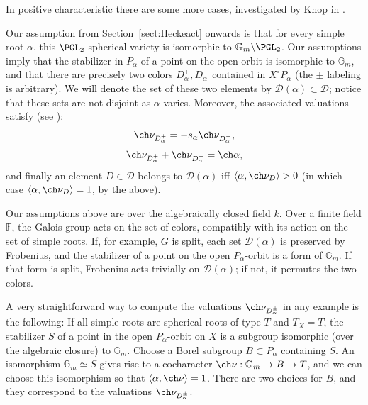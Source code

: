 In positive characteristic there are some more cases, investigated by Knop in \cite{Knop-sphericalroots}.

Our assumption from Section~\ref{sect:Heckeact} onwards is that for every simple root $\alpha$, this $\PGL_2$-spherical variety is isomorphic to $\mathbb G_m\backslash \PGL_2$. Our assumptions imply that the stabilizer in $P_\alpha$ of a point on the open orbit is isomorphic to $\mathbb G_m$, and that there are precisely two colors $D_\alpha^+, D_\alpha^-$ contained in $X^\circ P_\alpha$ (the $\pm $ labeling is arbitrary). We will denote the set of these two elements by $\mathcal D(\alpha)\subset\mathcal D$; notice that these sets are not disjoint as $\alpha$ varies. Moreover, the associated valuations satisfy (see \cite[\S 3.4]{Lun97}):
\[ \ch\nu_{D^+_\alpha} = -s_\alpha \ch\nu_{D^-_\alpha},\]
\[ \ch\nu_{D^+_\alpha} + \ch\nu_{D^-_\alpha} = \ch\alpha, \]
and finally an element $D\in \mathcal D$ belongs to $\mathcal D(\alpha)$ iff $\left<\alpha,\ch\nu_{D}\right> >0$ (in which case $\left<\alpha,\ch\nu_{D}\right> =1$, by the above).

\begin{rem}
\notready
 Our assumptions above are over the algebraically closed field $k$. Over a finite field $\mathbb F$, the Galois group acts on the set of colors, compatibly with its action on the set of simple roots. If, for example, $G$ is split, each set $\mathcal D(\alpha)$ is preserved by Frobenius, and the stabilizer of a point on the open $P_\alpha$-orbit is a form of $\mathbb G_m$. If that form is split, Frobenius acts trivially on $\mathcal D(\alpha)$; if not, it permutes the two colors.
\end{rem}


\begin{rem}
\notready\label{rem:valuation}
A very straightforward way to compute the valuations $\ch\nu_{D^{\pm}_\alpha}$ in any example is the following: If all simple roots are spherical roots of type $T$ and $T_X=T$, the stabilizer $S$ of a point in the open $P_\alpha$-orbit on $X$ is a subgroup isomorphic (over the algebraic closure) to $\mathbb G_m$. Choose a Borel subgroup $B\subset P_\alpha$ containing $S$. An isomorphism $\mathbb G_m\simeq S$ gives rise to a cocharacter $\ch\nu:\mathbb G_m \to B\to T$, and we can choose this isomorphism so that $\left<\alpha, \ch\nu \right> = 1$. There are two choices for $B$, and they correspond to the valuations $\ch\nu_{D^{\pm}_\alpha}$.
\end{rem}





